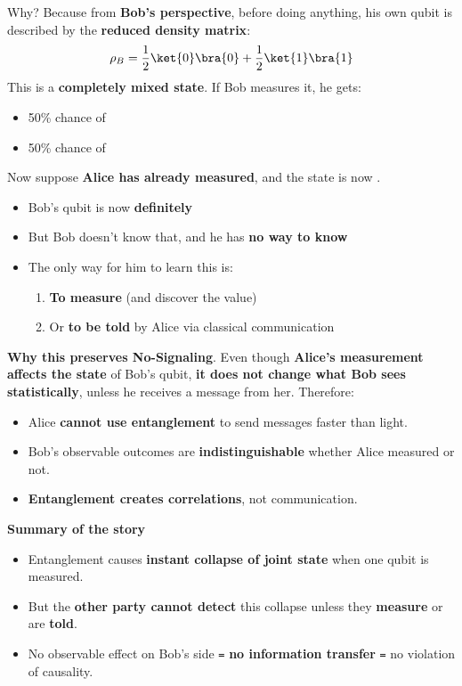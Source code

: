 \highspace
Why? Because from \textbf{Bob's perspective}, before doing anything, his own qubit is described by the \textbf{reduced density matrix}:
\begin{equation*}
    \rho_{B} = \dfrac{1}{2}\ket{0}\bra{0} + \dfrac{1}{2}\ket{1}\bra{1}
\end{equation*}
This is a \textbf{completely mixed state}. If Bob measures it, he gets:
\begin{itemize}
    \item 50\% chance of 
    \item 50\% chance of 
\end{itemize}
Now suppose \textbf{Alice has already measured}, and the state is now .
\begin{itemize}
    \item Bob's qubit is now \textbf{definitely }
    \item But Bob doesn't know that, and he has \textbf{no way to know}
    \item The only way for him to learn this is:
    \begin{enumerate}
        \item \textbf{To measure} (and discover the value)
        \item Or \textbf{to be told} by Alice via classical communication
    \end{enumerate}
\end{itemize}

\highspace
\textcolor{Green3}{\textbf{Why this preserves No-Signaling}}. Even though \textbf{Alice's measurement affects the state} of Bob's qubit, \textbf{it does not change what Bob sees statistically}, unless he receives a message from her. Therefore:
\begin{itemize}
    \item Alice \textbf{cannot use entanglement} to send messages faster than light.
    \item Bob's observable outcomes are \textbf{indistinguishable} whether Alice measured or not.
    \item \textbf{Entanglement creates correlations}, not communication.
\end{itemize}

\highspace
\textcolor{Green3}{\textbf{Summary of the story}}
\begin{itemize}
    \item Entanglement causes \textbf{instant collapse of joint state} when one qubit is measured.
    \item But the \textbf{other party cannot detect} this collapse unless they \textbf{measure} or are \textbf{told}.
    \item No observable effect on Bob's side \texttt{=} \textbf{no information transfer} \texttt{=} no violation of causality.
\end{itemize}

